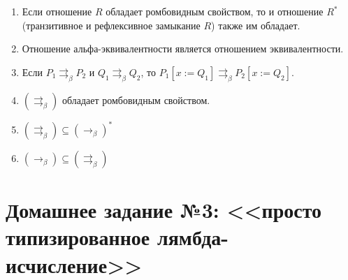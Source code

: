 \documentclass[10pt,a4paper,oneside]{article}
\begin{document}
\begin{enumerate}
\item Если отношение $R$ обладает ромбовидным свойством, то и отношение $R^*$ 
(транзитивное и рефлексивное замыкание $R$) также им обладает.
\item Отношение альфа-эквивалентности является отношением эквивалентности.
\item Если $P_1\rightrightarrows_\beta P_2$ и $Q_1\rightrightarrows_\beta Q_2$, то $P_1[x := Q_1] \rightrightarrows_\beta P_2[x := Q_2]$.
\item $(\rightrightarrows_\beta)$ обладает ромбовидным свойством.
\item $(\rightrightarrows_\beta) \subseteq (\rightarrow_\beta)^*$ 
\item $(\rightarrow_\beta) \subseteq (\rightrightarrows_\beta)$ 
\end{enumerate}

\section*{Домашнее задание №3: <<просто типизированное лямбда-исчисление>>}
\end{document}
